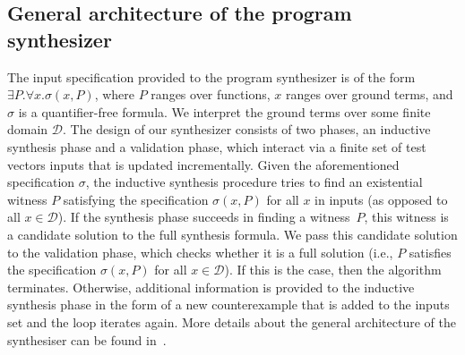 \documentclass[runningheads,a4paper]{llncs}
\begin{document}
 
\subsection{General architecture of the program synthesizer}
\label{synthesizer-general}
The input specification provided to the program synthesizer is of the form
$\exists P .  \forall x.  \sigma(x, P)$, 
where $P$ ranges over functions, 
$x$ ranges over ground terms, 
and $\sigma$ is a quantifier-free formula.  
We interpret the ground terms over some finite domain $\mathcal{D}$.
%
The design of our synthesizer consists of two phases, an inductive
synthesis phase and a validation phase, which interact via a finite
set of test vectors {\sc inputs} that is updated incrementally.  Given
the aforementioned specification $\sigma$, the inductive synthesis
procedure tries to find an existential witness $P$ satisfying
the specification $\sigma(x, P)$ for all $x$ in {\sc
  inputs} (as opposed to all $x \in \mathcal{D}$).
%
If the synthesis phase succeeds in finding a witness~$P$, this
witness is a candidate solution to the full synthesis formula.  We
pass this candidate solution to the validation phase, which checks
whether it is a full solution (i.e., $P$ satisfies the
specification $\sigma(x, P)$ for all
$x\in\mathcal{D}$).  If this is the case, then the algorithm
terminates.  Otherwise, additional information is provided to the
inductive synthesis phase in the form of a new counterexample that is
added to the {\sc inputs} set and the loop iterates again.
More details about the general architecture of the synthesiser can
be found in~\cite{DBLP:conf/lpar/DavidKL15}.
\end{document}
